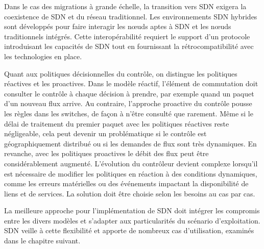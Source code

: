Dans le cas des migrations à grande échelle, la transition vers SDN exigera la coexistence de SDN et du réseau traditionnel. Les environnements SDN hybrides sont développés pour faire interagir les nœuds aptes à SDN et les nœuds traditionnels intégrés. Cette interopérabilité requiert le support d'un protocole introduisant les capacités de  SDN tout en fournissant la rétrocompatibilité avec les technologies en place. \cite{AdoptionResearchTrendsImplementationIssues}




Quant aux politiques décisionnelles du contrôle, on distingue les politiques réactives et les proactives. Dans le modèle réactif, l'élément de commutation doit consulter le contrôle à chaque décision à prendre, par exemple quand un paquet d'un nouveau flux arrive. Au contraire, l'approche proactive du contrôle pousse les règles dans les switches, de façon à n'être consulté que rarement. Même si le délai de traitement du premier paquet avec les politiques réactives reste négligeable, cela peut devenir un problématique si le contrôle est géographiquement distribué ou si les demandes de flux sont très dynamiques. En revanche, avec les politiques proactives le débit des flux peut être considérablement augmenté. L'évolution du contrôleur devient complexe lorsqu'il est nécessaire de modifier les politiques en réaction à des conditions dynamiques, comme les erreurs matérielles ou des événements impactant la disponibilité de liens et de services. La solution doit être choisie selon les besoins au cas par cas. \cite{SurveySDNArchi} \cite{CiscoSDNWhyLike} 

La meilleure approche pour l'implémentation de SDN doit intégrer les compromis entre les divers modèles et s'adapter aux particularités du scénario d'exploitation. SDN veille à cette flexibilité et apporte de nombreux cas d'utilisation, examinés dans le chapitre suivant.

